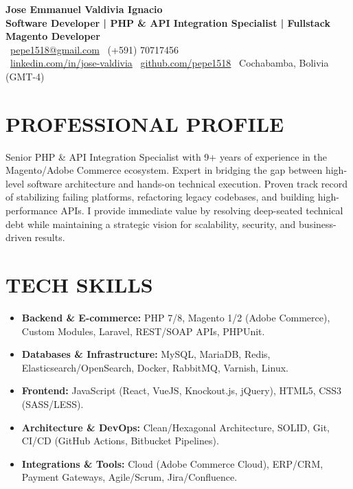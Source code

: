 \documentclass[11pt, a4paper]{article}
\newcommand{\header}[1]{\section*{\fontsize{10.5}{11}\selectfont\bfseries\color{accent}\uppercase{#1}}}
\begin{document}
	
	\begin{center}
		{\large \textbf{Jose Emmanuel Valdivia Ignacio}} \\[5pt]
		{\small \textbf{Software Developer | PHP \& API Integration Specialist | Fullstack Magento Developer}} \\[8pt]
		
		\faEnvelope\ \href{mailto:pepe1518@gmail.com}{\color{linkcolor}pepe1518@gmail.com} \quad 
		\faPhone\ (+591) 70717456  \\
		\faLinkedin\ \href{https://linkedin.com/in/jose-valdivia-697044100}{\color{linkcolor}linkedin.com/in/jose-valdivia} \quad 
		\faGithub\ \href{https://github.com/pepe1518}{\color{linkcolor}github.com/pepe1518} \quad
		\faMapMarker\ Cochabamba, Bolivia \, (GMT-4) \quad
	\end{center}
	
\header{Professional Profile}
Senior PHP \& API Integration Specialist with 9+ years of experience in the Magento/Adobe Commerce ecosystem. Expert in bridging the gap between high-level software architecture and hands-on technical execution. Proven track record of stabilizing failing platforms, refactoring legacy codebases, and building high-performance APIs. I provide immediate value by resolving deep-seated technical debt while maintaining a strategic vision for scalability, security, and business-driven results.
	
	\header{Tech Skills}
\begin{itemize}[noitemsep, topsep=2pt]
	\item \textbf{Backend \& E-commerce:} PHP 7/8, Magento 1/2 (Adobe Commerce), Custom Modules, Laravel, REST/SOAP APIs, PHPUnit.
	\item \textbf{Databases \& Infrastructure:} MySQL, MariaDB, Redis, Elasticsearch/OpenSearch, Docker, RabbitMQ, Varnish, Linux.
	\item \textbf{Frontend:} JavaScript (React, VueJS, Knockout.js, jQuery), HTML5, CSS3 (SASS/LESS).
	\item \textbf{Architecture \& DevOps:} Clean/Hexagonal Architecture, SOLID, Git, CI/CD (GitHub Actions, Bitbucket Pipelines).
	\item \textbf{Integrations \& Tools:} Cloud (Adobe Commerce Cloud), ERP/CRM, Payment Gateways, Agile/Scrum, Jira/Confluence.
\end{itemize}
	
\end{document}
